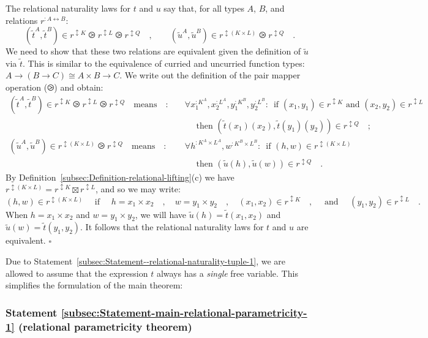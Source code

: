 The relational naturality laws for $t$ and $u$ say that, for all
types $A$, $B$, and relations $r^{:A\leftrightarrow B}$:
\[
(\tilde{t}^{A},\tilde{t}^{B})\in r^{\updownarrow K}\ogreaterthan r^{\updownarrow L}\ogreaterthan r^{\updownarrow Q}\quad,\quad\quad(\tilde{u}^{A},\tilde{u}^{B})\in r^{\updownarrow(K\times L)}\ogreaterthan r^{\updownarrow Q}\quad.
\]
We need to show that these two relations are equivalent given the
definition of $\tilde{u}$ via $\tilde{t}$. This is similar to the
equivalence of curried and uncurried function types: $A\rightarrow(B\rightarrow C)\cong A\times B\rightarrow C$.
We write out the definition of the pair mapper operation ($\ogreaterthan$)
and obtain: 
\begin{align*}
(\tilde{t}^{A},\tilde{t}^{B})\in r^{\updownarrow K}\ogreaterthan r^{\updownarrow L}\ogreaterthan r^{\updownarrow Q}\quad\text{means}\quad: & \quad\forall x_{1}^{:K^{A}},x_{2}^{:L^{A}},y_{1}^{:K^{B}},y_{2}^{:L^{B}}:\,\text{ if }(x_{1},y_{1})\in r^{\updownarrow K}\text{ and }(x_{2},y_{2})\in r^{\updownarrow L}\\
 & \quad\quad\text{ then }(\tilde{t}(x_{1})(x_{2}),\tilde{t}(y_{1})(y_{2}))\in r^{\updownarrow Q}\quad;\\
(\tilde{u}^{A},\tilde{u}^{B})\in r^{\updownarrow(K\times L)}\ogreaterthan r^{\updownarrow Q}\quad\text{means}\quad: & \quad\forall h^{:K^{A}\times L^{A}},w^{:K^{B}\times L^{B}}:\,\text{ if }(h,w)\in r^{\updownarrow(K\times L)}\\
 & \quad\quad\text{ then }(\tilde{u}(h),\tilde{u}(w))\in r^{\updownarrow Q}\quad.
\end{align*}
By Definition~\ref{subsec:Definition-relational-lifting}(c) we have
$r^{\updownarrow(K\times L)}=r^{\updownarrow K}\boxtimes r^{\updownarrow L}$,
and so we may write: 
\[
(h,w)\in r^{\updownarrow(K\times L)}\quad\text{ if }\quad h=x_{1}\times x_{2}\quad,\quad w=y_{1}\times y_{2}\quad,\quad(x_{1},x_{2})\in r^{\updownarrow K}\quad,\quad\text{ and }\quad(y_{1},y_{2})\in r^{\updownarrow L}\quad.
\]
When $h=x_{1}\times x_{2}$ and $w=y_{1}\times y_{2}$, we will have
$\tilde{u}(h)=\tilde{t}(x_{1},x_{2})$ and $\tilde{u}(w)=\tilde{t}(y_{1},y_{2})$.
It follows that the relational naturality laws for $t$ and $u$ are
equivalent. $\square$

Due to Statement~\ref{subsec:Statement--relational-naturality-tuple-1},
we are allowed to assume that the expression $t$ always has a \emph{single}
free variable. This simplifies the formulation of the main theorem:

\subsubsection{Statement \label{subsec:Statement-main-relational-parametricity-1}\ref{subsec:Statement-main-relational-parametricity-1}
(relational parametricity theorem)}

